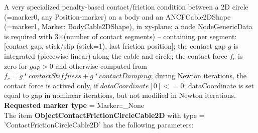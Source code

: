 A very specialized penalty-based contact/friction condition between a 2D circle (=marker0, any Position-marker) on a body and an ANCFCable2DShape (=marker1, Marker: BodyCable2DShape), in xy-plane; a node NodeGenericData is required with 3$\times$(number of contact segments) -- containing per segment: [contact gap, stick/slip (stick=1), last friction position]; the contact gap $g$ is integrated (piecewise linear) along the cable and circle; the contact force $f_c$ is zero for $gap>0$ and otherwise computed from $f_c = g*contactStiffness + \dot g*contactDamping$; during Newton iterations, the contact force is actived only, if $dataCoordinate[0] <= 0$; dataCoordinate is set equal to gap in nonlinear iterations, but not modified in Newton iterations.
 \\  {\bf Requested marker type} = Marker::\_None \\ 
\vspace{12pt} \noindent The item {\bf ObjectContactFrictionCircleCable2D} with type = 'ContactFrictionCircleCable2D' has the following parameters:\vspace{-1cm}\\ 
